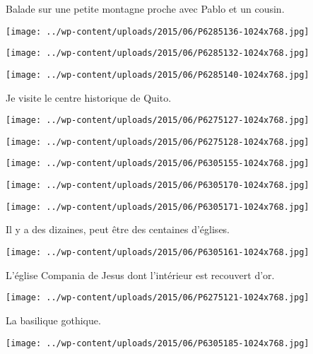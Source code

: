 Balade sur une petite montagne proche avec Pablo et un cousin. 
\begin{center} 
\texttt{[image: ../wp-content/uploads/2015/06/P6285136-1024x768.jpg]} 
\end{center}
\begin{center} 
\texttt{[image: ../wp-content/uploads/2015/06/P6285132-1024x768.jpg]} 
\end{center}
\begin{center} 
\texttt{[image: ../wp-content/uploads/2015/06/P6285140-1024x768.jpg]} 
\end{center}
\pagebreak

Je visite le centre historique de Quito. 
\begin{center} 
\texttt{[image: ../wp-content/uploads/2015/06/P6275127-1024x768.jpg]} 
\end{center}
\begin{center} 
\texttt{[image: ../wp-content/uploads/2015/06/P6275128-1024x768.jpg]} 
\end{center}
\begin{center} 
\texttt{[image: ../wp-content/uploads/2015/06/P6305155-1024x768.jpg]} 
\end{center}
\begin{center} 
\texttt{[image: ../wp-content/uploads/2015/06/P6305170-1024x768.jpg]} 
\end{center}
\begin{center} 
\texttt{[image: ../wp-content/uploads/2015/06/P6305171-1024x768.jpg]} 
\end{center}

Il y a des dizaines, peut être des centaines d'églises. 
\begin{center} 
\texttt{[image: ../wp-content/uploads/2015/06/P6305161-1024x768.jpg]}
\end{center}
\pagebreak

L'église Compania de Jesus dont l'intérieur est recouvert d'or. 
\begin{center} 
\texttt{[image: ../wp-content/uploads/2015/06/P6275121-1024x768.jpg]} 
\end{center}

La basilique gothique. 
\begin{center} 
\texttt{[image: ../wp-content/uploads/2015/06/P6305185-1024x768.jpg]} 
\end{center}

